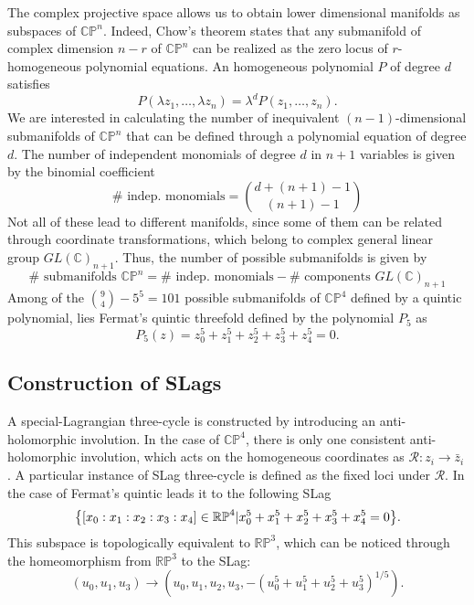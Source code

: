 The complex projective space allows us to obtain lower dimensional manifolds as subspaces of $\mathbb{CP}^n$.
Indeed, Chow's theorem states that any submanifold of complex dimension $n-r$ of $\mathbb{CP}^n$ can be realized as the zero locus of $r$-homogeneous polynomial equations.
An homogeneous polynomial $P$ of degree $d$ satisfies
\begin{equation}
  P(\lambda z_1,\ldots,\lambda z_n)=\lambda^d P(z_1,\ldots,z_n).
\end{equation}
We are interested in calculating the number of inequivalent $(n-1)$-dimensional submanifolds of $\mathbb{CP}^n$ that can be defined
through a polynomial equation of degree $d$.
The number of independent monomials of degree $d$ in $n+1$ variables is given by the binomial coefficient
\begin{equation}
  \# \text{ indep. monomials}={{d+(n+1)-1}\choose{(n+1)-1}}
\end{equation}
Not all of these lead to different manifolds, since some of them can be related through coordinate transformations, 
which belong to complex general linear group $GL(\mathbb C)_{n+1}$.
Thus, the number of possible submanifolds is given by
\begin{equation}
  \# \text{ submanifolds } \mathbb{CP}^n = \# \text{ indep. monomials}-\# \text{ components }GL(\mathbb C)_{n+1}
\end{equation}
Among of the ${{9}\choose{4}}-5^5=101$ possible submanifolds of $\mathbb{CP}^4$ defined by a quintic polynomial, lies
Fermat's quintic threefold defined by the polynomial $P_5$ as
\begin{equation}
  P_5(z) = z_0^5+z_1^5+z_2^5+z_3^5+z_4^5=0.
\end{equation}

\subsection{Construction of SLags}
A special-Lagrangian three-cycle is constructed by introducing an anti-holomorphic involution.
In the case of $\mathbb{CP}^4$, there is only one consistent anti-holomorphic involution,
which acts on the homogeneous coordinates as $\mathcal R: z_i \to\bar z_i$.
A particular instance of SLag three-cycle is defined as the fixed loci under $\mathcal R$.
In the case of Fermat's quintic leads it to the following SLag
\begin{equation}
  \qty{\qty[x_0:x_1:x_2:x_3:x_4]\in  \mathbb{RP}^4| x_0^5+x_1^5+x_2^5+x_3^5+x_4^5=0}.
\end{equation}
This subspace is topologically equivalent to $\mathbb{RP}^3$, which can be noticed through the
homeomorphism from $\mathbb{RP}^3$ to the SLag:
\begin{equation}
(u_0,u_1,u_3) \to (u_0,u_1,u_2,u_3, -(u_0^5+u_1^5+u_2^5+u_3^5)^{1/5}).
\end{equation}

